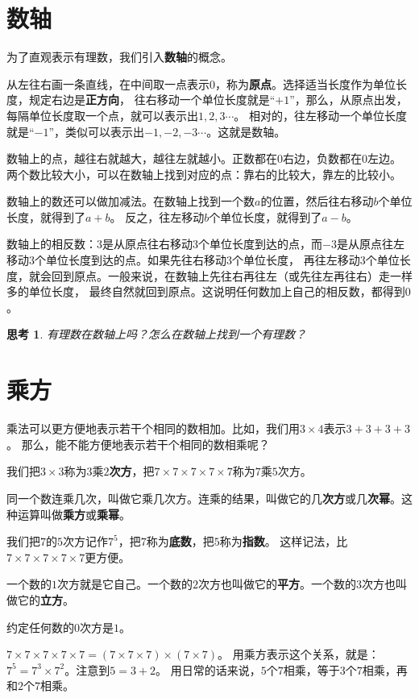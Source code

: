 \documentclass[12pt,UTF8]{ctexbook}
\newtheorem{sk}{思考}[section]
\begin{document}
\section{数轴}
为了直观表示有理数，我们引入\textbf{数轴}的概念。

从左往右画一条直线，在中间取一点表示$0$，称为\textbf{原点}。选择适当长度作为单位长度，规定右边是\textbf{正方向}，
往右移动一个单位长度就是“$+1$”，那么，从原点出发，每隔单位长度取一个点，就可以表示出$1,2,3\cdots$。
相对的，往左移动一个单位长度就是“$-1$”，类似可以表示出$-1,-2,-3\cdots$。这就是数轴。

数轴上的点，越往右就越大，越往左就越小。正数都在$0$右边，负数都在$0$左边。
两个数比较大小，可以在数轴上找到对应的点：靠右的比较大，靠左的比较小。

数轴上的数还可以做加减法。在数轴上找到一个数$a$的位置，然后往右移动$b$个单位长度，就得到了$a+b$。
反之，往左移动$b$个单位长度，就得到了$a-b$。

数轴上的相反数：$3$是从原点往右移动$3$个单位长度到达的点，而$-3$是从原点往左移动$3$个单位长度到达的点。如果先往右移动$3$个单位长度，
再往左移动$3$个单位长度，就会回到原点。一般来说，在数轴上先往右再往左（或先往左再往右）走一样多的单位长度，
最终自然就回到原点。这说明任何数加上自己的相反数，都得到$0$。

\begin{sk}\label{sk:0-1-0}
    有理数在数轴上吗？怎么在数轴上找到一个有理数？
\end{sk}

\section{乘方}
乘法可以更方便地表示若干个相同的数相加。比如，我们用$3 \times 4$表示$3+3+3+3$。
那么，能不能方便地表示若干个相同的数相乘呢？

我们把$3\times 3$称为$3$乘$2$\textbf{次方}，把$7\times 7\times 7\times 7\times 7$称为$7$乘$5$次方。

同一个数连乘几次，叫做它乘几次方。连乘的结果，叫做它的几\textbf{次方}或几\textbf{次幂}。这种运算叫做\textbf{乘方}或\textbf{乘幂}。

我们把$7$的$5$次方记作$7^5$，把$7$称为\textbf{底数}，把$5$称为\textbf{指数}。
这样记法，比$7\times 7\times 7\times 7\times 7$更方便。

一个数的$1$次方就是它自己。一个数的$2$次方也叫做它的\textbf{平方}。一个数的$3$次方也叫做它的\textbf{立方}。

约定任何数的$0$次方是$1$。

$7\times 7\times 7\times 7\times 7 = (7\times 7\times 7)\times (7\times 7)$。
用乘方表示这个关系，就是：$7^5 = 7^3 \times 7^2$。注意到$5 = 3 + 2$。
用日常的话来说，$5$个$7$相乘，等于$3$个$7$相乘，再和$2$个$7$相乘。
\end{document}
